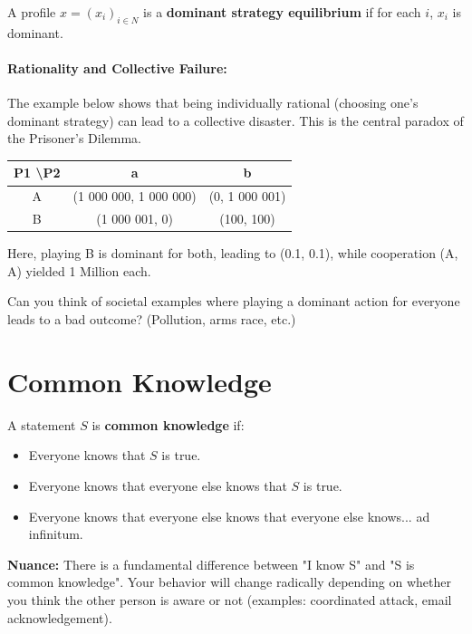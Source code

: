 \begin{definition}
A profile $x = (x_i)_{i \in N}$ is a \textbf{dominant strategy equilibrium} if for each $i$, $x_i$ is dominant.
\end{definition}

\paragraph{Rationality and Collective Failure:}
The example below shows that being individually rational (choosing one's dominant strategy) can lead to a collective disaster. This is the central paradox of the Prisoner's Dilemma.

\begin{center}
\begin{tabular}{c|c|c}
P1 \textbackslash P2 & a & b \\ \hline
A & (1 000 000, 1 000 000) & (0, 1 000 001) \\ \hline
B & (1 000 001, 0) & (100, 100)
\end{tabular}
\end{center}
Here, playing B is dominant for both, leading to (0.1, 0.1), while cooperation (A, A) yielded 1 Million each.

\begin{remarque}[Reflection]
Can you think of societal examples where playing a dominant action for everyone leads to a bad outcome? (Pollution, arms race, etc.)
\end{remarque}

\section{Common Knowledge}
\begin{definition}
A statement $S$ is \textbf{common knowledge} if:
\begin{itemize}
    \item Everyone knows that $S$ is true.
    \item Everyone knows that everyone else knows that $S$ is true.
    \item Everyone knows that everyone else knows that everyone else knows... ad infinitum.
\end{itemize}
\end{definition}
\textbf{Nuance:} There is a fundamental difference between "I know S" and "S is common knowledge". Your behavior will change radically depending on whether you think the other person is aware or not (examples: coordinated attack, email acknowledgement).

